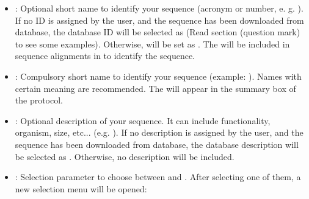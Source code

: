 \begin{itemize}
  \begin{itemize}
  \item {}: Optional short name to identify your sequence (acronym or number, e. g. ). If no ID is assigned by the user, and the sequence has been downloaded from  database, the database ID will be selected as  (Read  section (question mark) to see some examples). Otherwise,  will be set as . The  will be included in sequence alignments in \chimera to identify the sequence.
  \item {}: Compulsory short name to identify your sequence (example: ). Names with certain meaning are recommended. The  will appear in the summary box of the \scipion protocol.
  \item {}: Optional description of your sequence. It can include functionality, organism, size, etc... (e.g. ). If no description is assigned by the user, and the sequence has been downloaded from  database, the database description will be selected as . Otherwise, no description will be included.
  \item {}: Selection parameter to choose between  and . After selecting one of them, a new selection menu will be opened:
  

\end{itemize}
\end{itemize}
